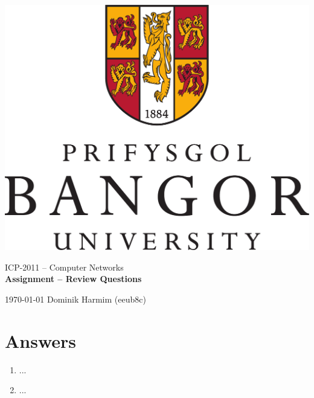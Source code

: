 \documentclass[a4paper, 11pt]{article}
\begin{document}
	\begin{titlepage}
		\begin{center}
			\includegraphics[width=0.5\linewidth]{inc/Bangor_logo.pdf} \\


			\LARGE{ICP-2011 -- Computer Networks} \\
			\Huge{\textbf{Assignment -- Review Questions}}

		\end{center}

		{\Large
			\today
			\hfill
			Dominik Harmim (eeub8c)
		}
	\end{titlepage}



	\section*{Answers}

	\begin{enumerate}
		\item
			...

		\item
			...
	\end{enumerate}
\end{document}
